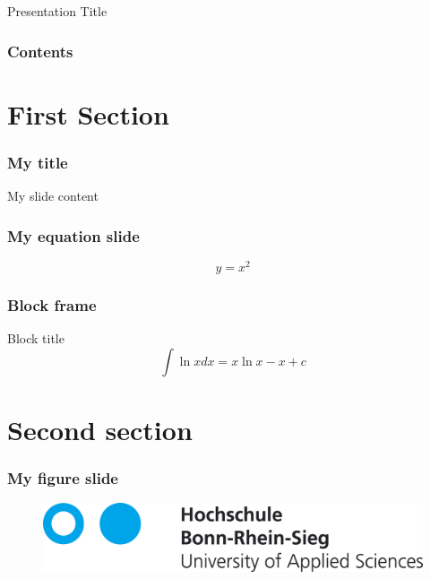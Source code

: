 \documentclass{beamer}
\begin{document}
    \begin{frame}
        \begin{center}
            {\Huge Presentation Title}
        \end{center}
    \end{frame}

    \begin{frame}
    \frametitle{Contents}
        \tableofcontents
    \end{frame}

    \section{First Section}

    \begin{frame}
    \frametitle{My title}
        My slide content
    \end{frame}

    \begin{frame}
    \frametitle{My equation slide}
        \begin{equation*}
            y = x^2
        \end{equation*}
    \end{frame}

    \begin{frame}
    \frametitle{Block frame}
        \begin{block}{Block title}
            \begin{equation}
                \int{\ln xdx} = x\ln x - x + c
            \end{equation}
        \end{block}
    \end{frame}

    \section{Second section}

    \begin{frame}
    \frametitle{My figure slide}
        \begin{figure}
            \includegraphics[scale=0.15]{hbrs_logo.png}
        \end{figure}
    \end{frame}
\end{document}

